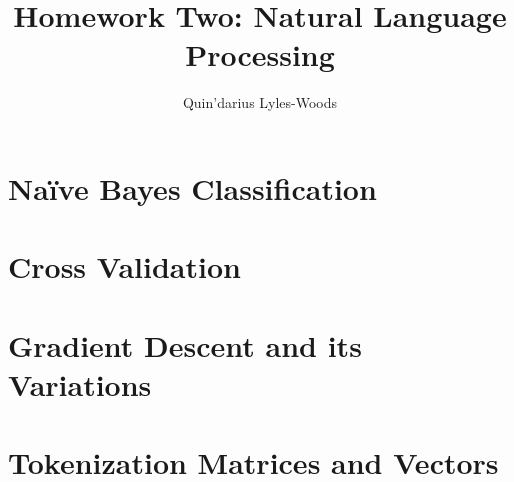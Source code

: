 \documentclass{article}
\title{Homework Two: Natural Language Processing}
\author{Quin'darius Lyles-Woods}
\begin{document}
\maketitle
\section{Na\" ive Bayes Classification}

\section{Cross Validation}

\section{Gradient Descent and its Variations}

\section{Tokenization Matrices and Vectors}

\end{document}
